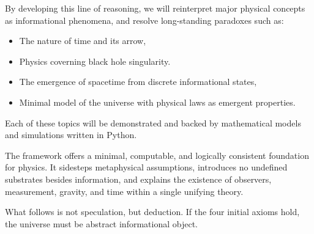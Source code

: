 By developing this line of reasoning, we will reinterpret major physical concepts as informational phenomena, and resolve long-standing paradoxes such as:

\begin{itemize}
      \item The nature of time and its arrow,
      \item Physics coverning black hole singularity.
      \item The emergence of spacetime from discrete informational states,
      \item Minimal model of the universe with physical laws as emergent properties.
\end{itemize}

Each  of these topics will be demonstrated and backed by mathematical models and simulations written in Python.

The  framework offers a minimal, computable, and logically consistent foundation for physics. It sidesteps metaphysical assumptions, introduces no undefined substrates besides information, and explains the existence of observers, measurement, gravity, and time within a single unifying theory.

What follows is not speculation, but deduction. If the four initial axioms hold, the universe must be abstract informational object.


